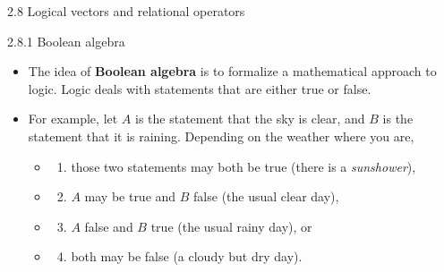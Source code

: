 \documentclass[
  9pt,
  a4paper,
  ignorenonframetext,
  notheorems]{beamer}
\providecommand{\tightlist}{%
  \setlength{\itemsep}{0pt}\setlength{\parskip}{0pt}}\usepackage{longtable,booktabs,array}
\begin{document}
\begin{frame}[fragile]{2.8 Logical vectors and relational operators}
\protect\hypertarget{logical-vectors-and-relational-operators}{}
\begin{block}{2.8.1 Boolean algebra}
\protect\hypertarget{boolean-algebra}{}
\begin{itemize}
\item
  The idea of \textbf{Boolean algebra} is to formalize a mathematical
  approach to logic. Logic deals with statements that are either true or
  false.
\item
  For example, let \(A\) is the statement that the sky is clear, and
  \(B\) is the statement that it is raining. Depending on the weather
  where you are,

  \begin{itemize}
  \item
    \begin{enumerate}
    [(1)]
    \tightlist
    \item
      those two statements may both be true (there is a
      \emph{sunshower}),
    \end{enumerate}
  \item
    \begin{enumerate}
    [(1)]
    \setcounter{enumi}{1}
    \tightlist
    \item
      \(A\) may be true and \(B\) false (the usual clear day),
    \end{enumerate}
  \item
    \begin{enumerate}
    [(1)]
    \setcounter{enumi}{2}
    \tightlist
    \item
      \(A\) false and \(B\) true (the usual rainy day), or
    \end{enumerate}
  \item
    \begin{enumerate}
    [(1)]
    \setcounter{enumi}{3}
    \tightlist
    \item
      both may be false (a cloudy but dry day).
    \end{enumerate}
  \end{itemize}
\end{itemize}


\end{block}
\end{frame}
\end{document}
